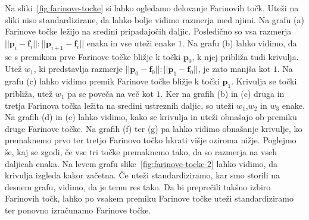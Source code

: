 \documentclass[isrm2, tisk]{fmfdelo}
\newcommand{\p}{\mathbf{p}}
\begin{document}
    Na sliki~\ref{fig:farinove-tocke} si lahko ogledamo delovanje Farinovih točk.
    Uteži na sliki niso standardizirane, da lahko bolje vidimo razmerja med njimi.
    Na grafu (a) Farinove točke ležijo na sredini pripadajočih daljic.
    Posledično so vsa razmerja $||\p_i-\mathbf{f}_i||:||\p_{i+1}-\mathbf{f}_i||$ enaka in vse uteži enake $1$.
    Na grafu (b) lahko vidimo, da se s premikom prve Farinove točke bližje k točki $\p_0$, k njej približa tudi krivulja.
    Utež $w_1$, ki predstavlja razmerje $||\p_0-\mathbf{f}_0||:||\p_{1}-\mathbf{f}_0||$, je zato manjša kot $1$.
    Na grafu (c) lahko vidimo premik Farinove točke bližje k točki $\p_1$.
    Krivulja se točki približa, utež $w_1$ pa se poveča na več kot $1$.
    Ker na grafih (b) in (c) druga in tretja Farinova točka ležita na sredini ustreznih daljic, so uteži $w_1$,$w_2$ in $w_3$ enake.
    Na grafih (d) in (e) lahko vidimo, kako se krivulja in uteži obnašajo ob premiku druge Farinove točke.
    Na grafih (f) ter (g) pa lahko vidimo obnašanje krivulje, ko premaknemo prvo ter tretjo Farinovo točko hkrati višje oziroma nižje.
    Poglejmo še, kaj se zgodi, če vse tri točke premaknemo tako, da so razmerja na vseh daljicah enaka.
    Na levem grafu slike~\ref{fig:farinove-tocke-2} lahko vidimo, da krivulja izgleda kakor začetna.
    Če uteži standardiziramo, kar smo storili na desnem grafu, vidimo, da je temu res tako.
    Da bi preprečili takšno izbiro Farinovih točk, lahko po vsakem premiku Farinove točke uteži standardiziramo ter ponovno izračunamo Farinove točke.
\end{document}
